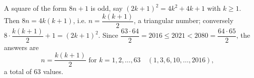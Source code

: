 A square of the form $8n+1$ is odd, say $(2k+1)^2=4k^2+4k+1$ with $k\ge1$. Then $8n=4k(k+1)$, i.e. $n=\dfrac{k(k+1)}{2}$, a triangular number; conversely $8\cdot\dfrac{k(k+1)}2+1=(2k+1)^2$. Since $\dfrac{63\cdot64}{2}=2016\le2021<2080=\dfrac{64\cdot65}{2}$, the answers are
\[\boxed{n=\dfrac{k(k+1)}{2}\text{ for }k=1,2,\dots,63}\quad(1,3,6,10,\dots,2016),\]
a total of $63$ values.

